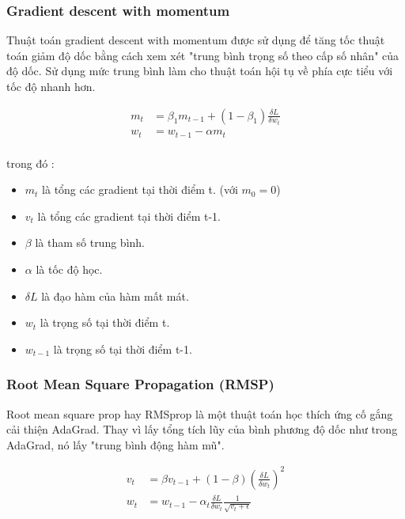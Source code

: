 \subsubsection*{Gradient descent with momentum}
Thuật toán gradient descent with momentum được sử dụng để tăng tốc thuật toán giảm độ dốc bằng cách xem xét "trung bình trọng số theo cấp số nhân" của độ dốc. 
Sử dụng mức trung bình làm cho thuật toán hội tụ về phía cực tiểu với tốc độ nhanh hơn.

\begin{equation}
\begin{aligned}
m_t & = \beta_1 m_{t-1} + (1 - \beta_1) \frac{\delta L}{\delta w_t} \\
w_t & = w_{t-1} - \alpha m_t\\
\end{aligned}
\end{equation}

trong đó :

\begin{itemize}
\item $m_t$ là tổng các gradient tại thời điểm t. (với $m_0 = 0$)
\item $v_t$ là tổng các gradient tại thời điểm t-1.
\item $\beta$ là tham số trung bình.
\item $\alpha$ là tốc độ học.
\item $\delta L$ là đạo hàm của hàm mất mát.
\item $w_t$ là trọng số tại thời điểm t.
\item $w_{t-1}$ là trọng số tại thời điểm t-1.  
\end{itemize}

\subsubsection*{Root Mean Square Propagation (RMSP)}
Root mean square prop hay RMSprop là một thuật toán học thích ứng cố gắng cải thiện AdaGrad. Thay vì lấy tổng tích lũy của bình phương độ dốc như trong AdaGrad, 
nó lấy "trung bình động hàm mũ".

\begin{equation}
\begin{aligned}
v_t & = \beta v_{t-1} + (1 - \beta) (\frac{\delta L}{\delta w_t})^2 \\
w_t & = w_{t-1} - \alpha_t \frac{\delta L}{\delta w_t} \frac{1}{\sqrt{v_t + \epsilon}}\\
\end{aligned}
\end{equation}

